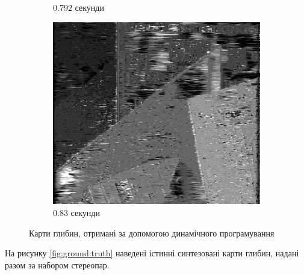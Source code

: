 \begin{figure}[h]
\begin{subfigure}[t]{0.32\textwidth}
        \caption{$0.792$ секунди}
        \label{fig:flowerpots:result:dynamic}
    \end{subfigure}
    \hfill
    \begin{subfigure}[t]{0.32\textwidth}
        \centering
        \includegraphics[width=\textwidth]{images/poster_dynamic_result}
        \caption{$0.83$ секунди}
        \label{fig:poster:result:dynamic}
    \end{subfigure}
    \caption{Карти глибин, отримані за допомогою динамічного програмування}
    \label{fig:result:dynamic}
\end{figure}

На рисунку \ref{fig:ground:truth}
наведені істинні синтезовані карти глибин,
надані разом за набором стереопар.

